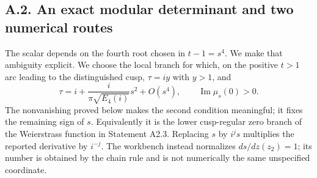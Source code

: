 \subsection{A.2. An exact modular determinant and two numerical routes}

The scalar depends on the fourth root chosen in $t-1=s^4$.  We make
that ambiguity explicit.  We choose the local branch for which, on
the positive $t>1$ arc leading to the distinguished cusp,
$\tau=iy$ with $y>1$, and
\begin{equation}\label{inv:eq:A-s-branch}
\tau=i+\frac{i}{\pi\sqrt{E_4(i)}}s^2+O(s^4),\qquad
\operatorname{Im}\mu_s(0)>0.
\end{equation}
The nonvanishing proved below makes the second condition meaningful;
it fixes the remaining sign of $s$.  Equivalently it is the lower
cusp-regular zero branch of the Weierstrass function in Statement A2.3.
Replacing $s$ by $i^js$ multiplies the reported derivative by $i^{-j}$.
The workbench instead normalizes $ds/dz(z_2)=1$; its number is obtained
by the chain rule and is not numerically the same unspecified coordinate.

